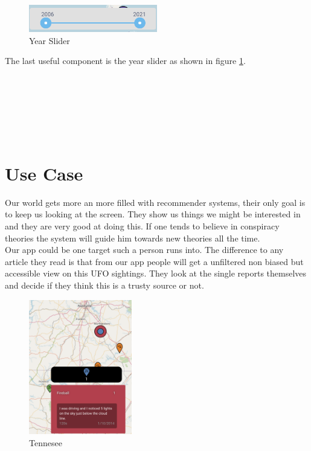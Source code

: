 \documentclass{article}
\begin{document}
\begin{figure} 
    \centering
    \includegraphics[width=0.5\textwidth]{yearSilder}
    \caption{Year Slider}
    \label{fig:yearSilder}
\end{figure}

The last useful component is the year slider as shown in figure \ref{fig:yearSilder}. 
\\\\\\\\\\\\\\

\section*{Use Case}

Our world gets more an more filled with recommender systems, their only goal is to keep us looking at the screen. They show us things we might be interested in and they are very good at doing this. If one tends to believe in conspiracy theories the system will guide him towards new theories all the time.  \\
Our app could be one target such a person runs into. The difference to any article they read is that from our app people will get a unfiltered non biased but accessible view on this UFO sightings. They look at the single reports themselves and decide if they think this is a trusty source or not. \\

\newpage

\begin{figure} 
    \centering
    \includegraphics[width=0.4\textwidth]{Tennesee}
    \caption{Tennesee}
    \label{fig:Tennesee}
\end{figure}
\end{document}
